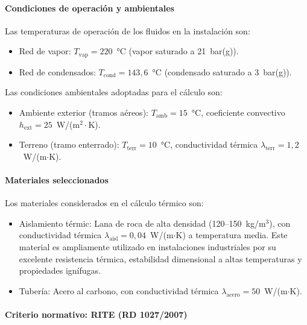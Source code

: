 \documentclass[12pt]{article}
\begin{document}
\paragraph{Condiciones de operación y ambientales}
\label{par:condiciones_operacion_aisl}

Las temperaturas de operación de los fluidos en la instalación son:

\begin{itemize}[noitemsep]
	\item Red de vapor: $T_{\text{vap}} = 220$~°C (vapor saturado a 21~bar(g)).
	\item Red de condensados: $T_{\text{cond}} = 143{,}6$~°C (condensado saturado a 3~bar(g)).
\end{itemize}

Las condiciones ambientales adoptadas para el cálculo son:

\begin{itemize}[noitemsep]
	\item Ambiente exterior (tramos aéreos): $T_{\text{amb}} = 15$~°C, coeficiente convectivo $h_{\text{ext}} = 25$~W/(m$^2\cdot$K).
	\item Terreno (tramo enterrado): $T_{\text{terr}} = 10$~°C, conductividad térmica $\lambda_{\text{terr}} = 1{,}2$~W/(m$\cdot$K).
\end{itemize}

\paragraph{Materiales seleccionados}
\label{par:materiales_aislamiento}

Los materiales considerados en el cálculo térmico son:

\begin{itemize}[noitemsep]
	\item Aislamiento térmic: Lana de roca de alta densidad (120--150~kg/m$^3$), con conductividad térmica $\lambda_{\text{aisl}} = 0{,}04$~W/(m$\cdot$K) a temperatura media. Este material es ampliamente utilizado en instalaciones industriales por su excelente resistencia térmica, estabilidad dimensional a altas temperaturas y propiedades ignífugas.
	\item Tubería: Acero al carbono, con conductividad térmica $\lambda_{\text{acero}} = 50$~W/(m$\cdot$K).
\end{itemize}

\paragraph{Criterio normativo: RITE (RD 1027/2007)}
\label{par:criterio_rite}
\end{document}
